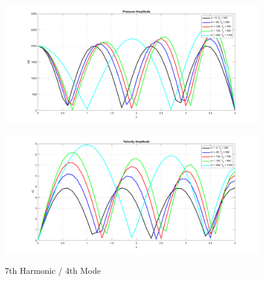 \documentclass[8pt]{article} %
\begin{document}
\begin{figure}[H]
  \centering
  \begin{minipage}[b]{0.495\linewidth}
    \centering
    \includegraphics[width=\linewidth]{pvsx4}
    \label{fig:pvsx4}
  \end{minipage}
  \hfill
  \begin{minipage}[b]{0.495\linewidth}
    \centering
    \includegraphics[width=\linewidth]{vvsx4}
    \label{fig:vvsx4}
  \end{minipage}
\caption{7th Harmonic / 4th Mode}
\end{figure}
\end{document}
